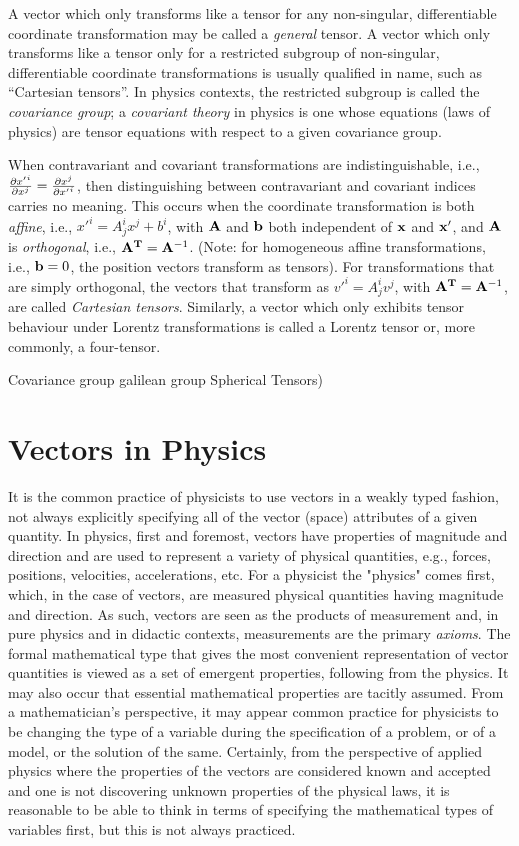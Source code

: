 \documentclass{llncs}
\begin{document}
A vector which only transforms like a tensor for any non-singular,
differentiable coordinate transformation may be called a {\em general}
tensor.
A vector which only transforms like a tensor only for a restricted
subgroup of non-singular, differentiable coordinate transformations is
usually qualified in name, such as ``Cartesian tensors''.
In physics contexts, the restricted subgroup is called the
{\em covariance group};
a {\em covariant theory} in physics is one whose equations (laws of
physics) are tensor equations with respect to a given covariance
group.

When contravariant and covariant transformations are
indistinguishable, i.e.,
${\partial {x'}^i \over \partial x^j} = 
 {\partial x^{j} \over \partial {x'}^i}$,
then distinguishing between contravariant and covariant indices
carries no meaning.
This occurs when the coordinate transformation is both {\em affine}, i.e.,
${x'}^i = A^i_j x^j +b^i$,
with ${\bf A}$ and ${\bf b}$ both independent of ${\bf x}$ and ${\bf
  x}'$,
and ${\bf A}$ is {\em orthogonal}, i.e., ${\bf A}^{\bf T} = {\bf A}^{-1}$.
(Note: for homogeneous affine transformations, i.e., ${\bf b}=0$,
the position vectors transform as tensors).
For transformations that are simply orthogonal, the vectors that
transform as ${v'}^i = A^i_j v^j$, with
${\bf A}^{\bf T} = {\bf A}^{-1}$,
are called {\em Cartesian tensors}.
Similarly, a vector which only exhibits tensor behaviour under Lorentz
transformations is called a Lorentz tensor or, more commonly, a
four-tensor.


Covariance group
galilean group
Spherical Tensors)


\section{Vectors in Physics}

It is the common practice of physicists to use vectors in a weakly
typed fashion, not always explicitly specifying all of the vector
(space) attributes of a given quantity.
In physics, first and foremost, vectors have properties of magnitude
and direction and are used to represent a variety of physical
quantities, e.g., forces, positions, velocities, accelerations, etc.
For a physicist the "physics" comes first, which, in the case of
vectors, are measured physical quantities having magnitude and
direction.
As such, vectors are seen as the products of measurement and, in
pure physics and in didactic contexts, measurements are the primary
{\em axioms}.
The formal mathematical type that gives the most convenient
representation of vector quantities is viewed as a set of emergent
properties, following from the physics.
It may also occur that essential mathematical properties are tacitly
assumed. 
From a mathematician's perspective, it may appear common
practice for physicists to be changing the type of a variable during
the specification of a problem, or of a model, or the solution of the
same.
Certainly, from the perspective of applied physics where the
properties of the vectors are considered known and accepted and one is
not discovering unknown properties of the physical laws, it is
reasonable to be able to think in terms of specifying the mathematical
types of variables first, but this is not always practiced.
\end{document}
